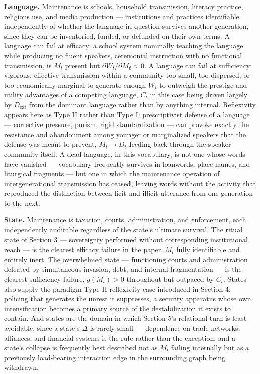 \documentclass[11pt]{article}
\theoremstyle{plain}
\begin{document}
\textbf{Language.} Maintenance is schools, household transmission, literacy practice, religious use, and media production --- institutions and practices identifiable independently of whether the language in question survives another generation, since they can be inventoried, funded, or defunded on their own terms. A language can fail at efficacy: a school system nominally teaching the language while producing no fluent speakers, ceremonial instruction with no functional transmission, is \(M_t\) present but \(\partial W_t/\partial M_t \approx 0\). A language can fail at sufficiency: vigorous, effective transmission within a community too small, too dispersed, or too economically marginal to generate enough \(W_t\) to outweigh the prestige and utility advantages of a competing language, \(C_t\) in this case being driven largely by \(D_{\mathrm{ext}}\) from the dominant language rather than by anything internal. Reflexivity appears here as Type II rather than Type I: prescriptivist defense of a language --- corrective pressure, purism, rigid standardization --- can provoke exactly the resistance and abandonment among younger or marginalized speakers that the defense was meant to prevent, \(M_t \to D_t\) feeding back through the speaker community itself. A dead language, in this vocabulary, is not one whose words have vanished --- vocabulary frequently survives in loanwords, place names, and liturgical fragments --- but one in which the maintenance operation of intergenerational transmission has ceased, leaving words without the activity that reproduced the distinction between licit and illicit utterance from one generation to the next.

\textbf{State.} Maintenance is taxation, courts, administration, and enforcement, each independently auditable regardless of the state's ultimate survival. The ritual state of Section 3 --- sovereignty performed without corresponding institutional reach --- is the clearest efficacy failure in the paper, \(M_t\) fully identifiable and entirely inert. The overwhelmed state --- functioning courts and administration defeated by simultaneous invasion, debt, and internal fragmentation --- is the clearest sufficiency failure, \(g(M_t) > 0\) throughout but outpaced by \(C_t\). States also supply the paradigm Type II reflexivity case introduced in Section 4: policing that generates the unrest it suppresses, a security apparatus whose own intensification becomes a primary source of the destabilization it exists to contain. And states are the domain in which Section 5's relational turn is least avoidable, since a state's \(\Delta\) is rarely small --- dependence on trade networks, alliances, and financial systems is the rule rather than the exception, and a state's collapse is frequently best described not as \(M_t\) failing internally but as a previously load-bearing interaction edge in the surrounding graph being withdrawn.
\end{document}
